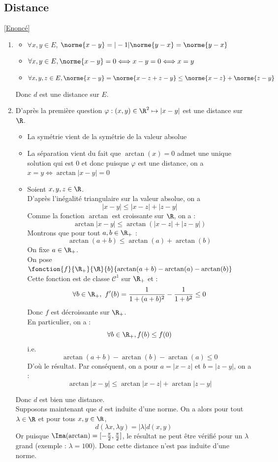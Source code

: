 \documentclass{book}
\begin{document}
	\subsection{Distance }
	\label{Distance corrigé}
	\textcolor{blue}{\hyperref[Distance]{[Enoncé]}}\\
		\begin{enumerate}[leftmargin=*]
			\item \begin{itemize}
				\item $\forall x,y\in E$, $\norme{x-y}=|-1|\norme{y-x}=\norme{y-x}$
				\item $\forall x,y\in E, \norme{x-y}=0\Longleftrightarrow x-y=0\Longleftrightarrow x=y$
				\item $\forall x,y,z\in E, \norme{x-y}=\norme{x-z+z-y}\leq \norme{x-z}+\norme{z-y}$
			\end{itemize}
			Donc $d$ est une distance sur $E$.
			\item D'après la première question $\varphi:(x,y)\in\R^2\mapsto |x-y|$ est une distance sur $\R$.
			\begin{itemize}
				\item La symétrie vient de la symétrie de la valeur absolue
				\item La séparation vient du fait que $\arctan(x)=0$ admet une unique solution qui est $0$ et donc puisque $\varphi$ est une distance, on a $x=y\Longleftrightarrow \arctan|x-y|=0$
				\item Soient $x,y,z\in\R$.\\
				D'après l'inégalité triangulaire sur la valeur absolue, on a 
				\[|x-y|\leq|x-z|+|z-y|\]
				Comme la fonction $\arctan$ est croissante sur $\R$, on a :
				\[\arctan|x-y|\leq \arctan\left(|x-z|+|z-y|\right)\]
				Montrons que pour tout $a,b\in\R_+$ :
				\[\arctan(a+b)\leq\arctan(a)+\arctan(b)\]
				On fixe $a\in\R_+$.\\
				On pose $\fonction{f}{\R_+}{\R}{b}{\arctan(a+b)-\arctan(a)-\arctan(b)}$\\
				Cette fonction est de classe $\mathcal C^1$ sur $\R_+$ et :
				\[\forall b\in \R_+,\ f'(b)=\frac{1}{1+(a+b)^2}-\frac{1}{1+b^2}\leq 0\]
				Donc $f$ est décroissante sur $\R_+$.\\
				En particulier, on a : \[\forall b\in\R_+, f(b)\leq f(0)\]
				i.e. \[\arctan(a+b)-\arctan(b)-\arctan(a)\leq 0\]
				D'où le résultat.
				Par conséquent, on a pour $a=|x-z|$ et $b=|z-y|$, on a :
				\[\arctan|x-y|\leq \arctan|x-z|+\arctan|z-y|\]
			\end{itemize}
			Donc $d$ est bien une distance.\\
			Supposons maintenant que $d$ est induite d'une norme.
			On a alors pour tout $\lambda\in\R$ et pour tous $x,y\in\R$, 
			\[d(\lambda x,\lambda y)=|\lambda|d(x,y)\]
			Or puisque $\Ima(\arctan)=[-\frac{\pi}{2},\frac{\pi}{2}]$, le résultat ne peut être vérifié pour un $\lambda$ grand (exemple : $\lambda=100$).
			Donc cette distance n'est pas induite d'une norme.
		\end{enumerate}
\end{document}
